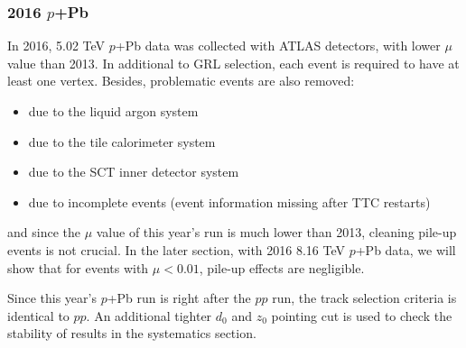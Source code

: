 \subsubsection{2016 $p$+Pb}
In 2016, 5.02 TeV $p$+Pb data was collected with ATLAS detectors, with lower $\mu$ value than 2013. In additional to GRL selection, each event is required to have at least one vertex. Besides, problematic events are also removed:
\begin{itemize}
\item due to the liquid argon system
\item due to the tile calorimeter system
\item due to the SCT inner detector system
\item due to incomplete events (event information missing after TTC restarts)
\end{itemize}
and since the $\mu$ value of this year's run is much lower than 2013, cleaning pile-up events is not crucial. In the later section, with 2016 8.16 TeV $p$+Pb data, we will show that for events with $\mu<0.01$, pile-up effects are negligible.

Since this year's $p$+Pb run is right after the $pp$ run, the track selection criteria is identical to $pp$. An additional tighter $d_{0}$ and $z_{0}$ pointing cut is used to check the stability of results in the systematics section.

